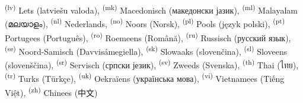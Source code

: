 \documentclass[onecolumn,a4paper,10pt]{report}
\begin{document}
\textsuperscript{(lv)}  Lets (\foreignlanguage{latvian}{latviešu valoda}),
\textsuperscript{(mk)} Macedonisch (\foreignlanguage{macedonian}{македонски јазик}),
\textsuperscript{(ml)} Malayalam (\foreignlanguage{malayalam}{മലയാളം}),
\textsuperscript{(nl)}  Nederlands,
\textsuperscript{(no)}  Noors (\foreignlanguage{norwegian}{Norsk}),
\textsuperscript{(pl)}  Pools (\foreignlanguage{polish}{język polski}),
\textsuperscript{(pt)}  Portugees (\foreignlanguage{portuguese}{Português}),
\textsuperscript{(ro)}  Roemeens (\foreignlanguage{romanian}{Română}),
\textsuperscript{(ru)}  Russisch (\foreignlanguage{russian}{русский язык}),
\textsuperscript{(se)} Noord-Samisch (\foreignlanguage{samin}{Davvisámegiella}),
\textsuperscript{(sk)}  Slowaaks (\foreignlanguage{slovak}{slovenčina}),
\textsuperscript{(sl)}  Sloveens (\foreignlanguage{slovenian}{slovenščina}),
\textsuperscript{(sr)}  Servisch (\foreignlanguage{serbian}{српски језик}),
\textsuperscript{(sv)}  Zweeds (\foreignlanguage{swedish}{Svenska}),
\textsuperscript{(th)}  Thai (\foreignlanguage{thai}{ไทย}),
\textsuperscript{(tr)}  Turks (\foreignlanguage{turkish}{Türkçe}),
\textsuperscript{(uk)}  Oekraïens (\foreignlanguage{ukrainian}{українська мова}),
\textsuperscript{(vi)}  Vietnamees (\foreignlanguage{vietnamese}{Tiếng Việt}),
\textsuperscript{(zh)}  Chinees (\foreignlanguage{chinese}{中文})

\newpage

\end{document}
